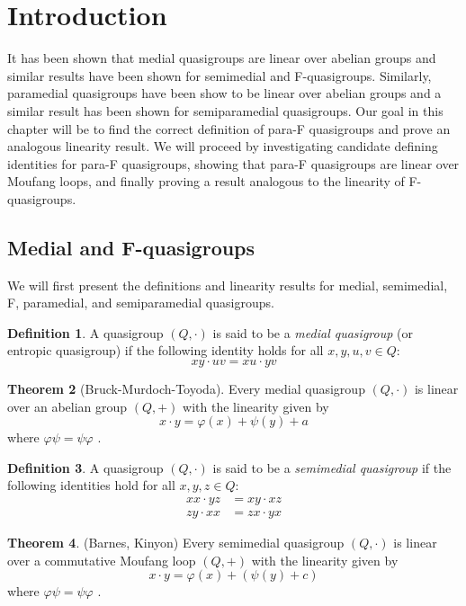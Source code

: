 \documentclass[12pt, twoside, openright]{report}
\theoremstyle{definition}
\newtheorem{thm}{Theorem}[chapter]
\newtheorem{dfn}[thm]{Definition}
\begin{document}
\section{Introduction}\label{para-f-intro}

It has been shown that medial quasigroups are linear over abelian groups and similar results have
  been shown for semimedial and F-quasigroups. Similarly, paramedial quasigroups have been show
  to be linear over abelian groups and a similar result has been shown for semiparamedial
  quasigroups. Our goal in this chapter will be to find the correct definition of para-F quasigroups
  and prove an analogous linearity result. We will proceed by investigating candidate defining
  identities for para-F quasigroups, showing that para-F quasigroups are linear over Moufang loops,
  and finally proving a result analogous to the linearity of F-quasigroups.

\subsection{Medial and F-quasigroups}

We will first present the definitions and linearity results for medial, semimedial, F,
  paramedial, and semiparamedial quasigroups.

\begin{dfn}
  A quasigroup $(Q, \cdot)$ is said to be a \emph{medial quasigroup} (or entropic quasigroup)
    if the following identity holds for all $x, y, u, v\in Q$:
  \[xy\cdot uv = xu\cdot yv\]
\end{dfn}

\begin{thm}[Bruck-Murdoch-Toyoda]
  Every medial quasigroup $(Q, \cdot)$ is linear over an abelian group $(Q, +)$ with the linearity
    given by
  \[x\cdot y = \varphi(x) + \psi(y) + a\]
  where $\varphi\psi = \psi\varphi$ \cite{SP}.
\end{thm}

\begin{dfn}
  A quasigroup $(Q, \cdot)$ is said to be a \emph{semimedial quasigroup} if the following identities
    hold for all $x, y, z\in Q$:
  \begin{align*}
    xx\cdot yz &= xy\cdot xz\\
    zy\cdot xx &= zx\cdot yx
  \end{align*}
\end{dfn}

\begin{thm}(Barnes, Kinyon)
  Every semimedial quasigroup $(Q, \cdot)$ is linear over a commutative Moufang loop $(Q, +)$ with
    the linearity given by
  \[x\cdot y = \varphi(x) + (\psi(y) + c)\]
  where $\varphi\psi = \psi\varphi$ \cite{BK-isotopes}.
\end{thm}
\end{document}
